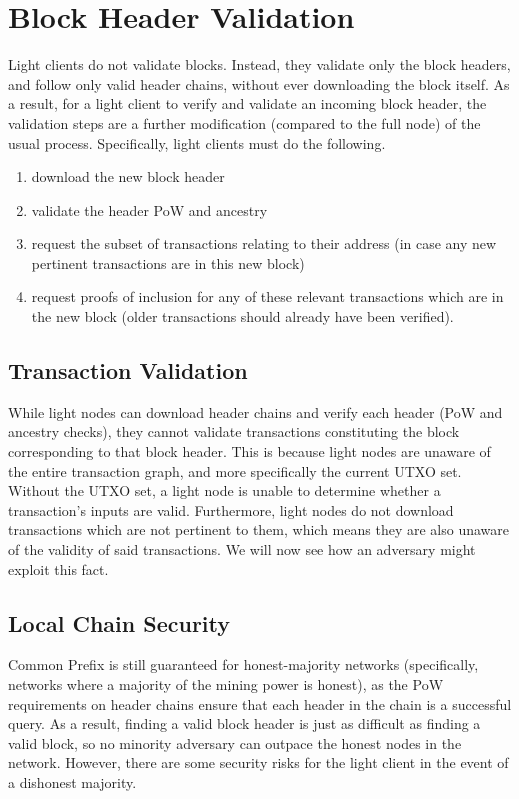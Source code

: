 \section{Block Header Validation}
Light clients do not validate blocks. Instead, they validate only the block headers, and follow only valid header chains, without ever downloading the block itself. As a result, for a light client to verify and validate an incoming block header, the validation steps are a further modification (compared to the full node) of the usual process. Specifically, light clients must do the following.
\begin{enumerate}
    \item download the new block header
    \item validate the header PoW and ancestry
    \item request the subset of transactions relating to their address (in case any new pertinent transactions are in this new block)
    \item request proofs of inclusion for any of these relevant transactions which are in the new block (older transactions should already have been verified).
\end{enumerate}



\subsection{Transaction Validation}
While light nodes can download header chains and verify each header (PoW and ancestry checks), they cannot validate transactions constituting the block corresponding to that block header. This is because light nodes are unaware of the entire transaction graph, and more specifically the current UTXO set. Without the UTXO set, a light node is unable to determine whether a transaction's inputs are valid. Furthermore, light nodes do not download transactions which are not pertinent to them, which means they are also unaware of the validity of said transactions. We will now see how an adversary might exploit this fact.

\subsection{Local Chain Security}
Common Prefix is still guaranteed for honest-majority networks (specifically, networks where a majority of the mining power is honest), as the PoW requirements on header chains ensure that each header in the chain is a successful query. As a result, finding a valid block header is just as difficult as finding a valid block, so no minority adversary can outpace the honest nodes in the network. However, there are some security risks for the light client in the event of a dishonest majority.

